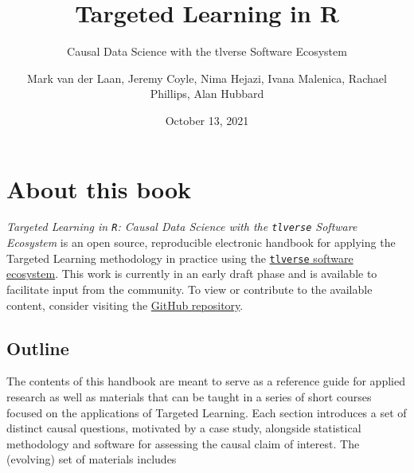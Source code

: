 \documentclass[
  12pt, krantz2,
]{krantz}
\title{Targeted Learning in R}
\subtitle{Causal Data Science with the tlverse Software Ecosystem}
\author{Mark van der Laan, Jeremy Coyle, Nima Hejazi, Ivana Malenica, Rachael Phillips, Alan Hubbard}
\date{October 13, 2021}
\newcommand{\passthrough}[1]{#1}
\theoremstyle{definition}
\theoremstyle{definition}
\theoremstyle{definition}
\newcommand{\1}{\mathbbm{1}}
\begin{document}
\maketitle


\thispagestyle{empty}

\begin{center}
\end{center}

\setlength{\abovedisplayskip}{-5pt}
\setlength{\abovedisplayshortskip}{-5pt}

\mainmatter

{
\hypersetup{linkcolor=}
\setcounter{tocdepth}{2}
\tableofcontents
}
\listoftables
\listoffigures
\hypertarget{about-this-book}{%
\chapter*{About this book}\label{about-this-book}}


\emph{Targeted Learning in \passthrough{\lstinline!R!}: Causal Data Science with the \passthrough{\lstinline!tlverse!} Software
Ecosystem} is an open source, reproducible electronic handbook for applying the
Targeted Learning methodology in practice using the \href{https://github.com/tlverse}{\passthrough{\lstinline!tlverse!} software
ecosystem}. This work is currently in an early draft
phase and is available to facilitate input from the community. To view or
contribute to the available content, consider visiting the \href{https://github.com/tlverse/tlverse-handbook}{GitHub
repository}.

\hypertarget{outline}{%
\section{Outline}\label{outline}}

The contents of this handbook are meant to serve as a reference guide for
applied research as well as materials that can be taught in a series of short
courses focused on the applications of Targeted Learning. Each section
introduces a set of distinct causal questions, motivated by a case study,
alongside statistical methodology and software for assessing the causal claim of
interest. The (evolving) set of materials includes
\end{document}

